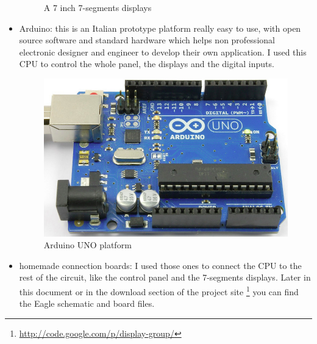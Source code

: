 \documentclass[11pt,english]{article}
\begin{document}
\begin{itemize}
\begin{figure}[H]
  \caption{A 7 inch 7-segments displays \label{fig:7-inch-dis}}

  \end{figure}
  
 \item Arduino: this is an Italian prototype platform really easy to use, with open source 
 software and standard hardware which helps non professional electronic designer and engineer 
 to develop their own application. I used this CPU to control the whole panel, the displays 
 and the digital inputs.
 
  \begin{figure}[H]
  \centering\includegraphics[scale=0.25]{img/Arduino}

  \caption{Arduino UNO platform\label{fig:arduino}}

  \end{figure}
 
 \item homemade connection boards: I used those ones to connect the CPU to the rest of the 
 circuit, like the control panel and the 7-segments displays. Later in this document or in the 
 download section of the project site \footnote{\url{http://code.google.com/p/display-group/}}  
 you can find the Eagle schematic and board files.
 

\end{itemize}
\end{document}

